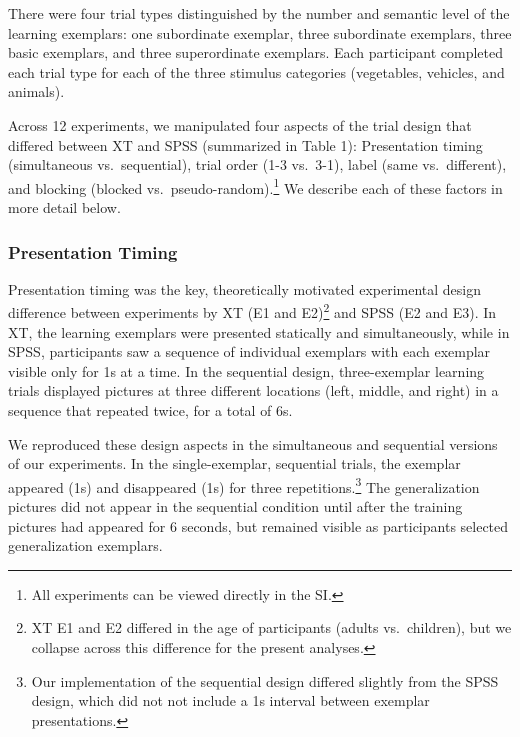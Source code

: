 \documentclass[english,floatsintext,man]{apa6}
\theoremstyle{definition}
\theoremstyle{definition}
\theoremstyle{definition}
\theoremstyle{remark}
\begin{document}
There were four trial types distinguished by the number and semantic
level of the learning exemplars: one subordinate exemplar, three
subordinate exemplars, three basic exemplars, and three superordinate
exemplars. Each participant completed each trial type for each of the
three stimulus categories (vegetables, vehicles, and animals).

Across 12 experiments, we manipulated four aspects of the trial design
that differed between XT and SPSS (summarized in Table 1): Presentation
timing (simultaneous vs.~sequential), trial order (1-3 vs.~3-1), label
(same vs.~different), and blocking (blocked
vs.~pseudo-random).\footnote{All experiments can be viewed directly in the SI.}
We describe each of these factors in more detail below.

\subsubsection{Presentation Timing}\label{presentation-timing}

Presentation timing was the key, theoretically motivated experimental
design difference between experiments by XT (E1 and
E2)\footnote{XT E1 and E2 differed in the age of participants (adults vs.\ children), but we collapse across this difference for the present analyses.}
and SPSS (E2 and E3). In XT, the learning exemplars were presented
statically and simultaneously, while in SPSS, participants saw a
sequence of individual exemplars with each exemplar visible only for 1s
at a time. In the sequential design, three-exemplar learning trials
displayed pictures at three different locations (left, middle, and
right) in a sequence that repeated twice, for a total of 6s.

We reproduced these design aspects in the simultaneous and sequential
versions of our experiments. In the single-exemplar, sequential trials,
the exemplar appeared (1s) and disappeared (1s) for three
repetitions.\footnote{Our implementation of the sequential design differed slightly from the SPSS design, which did not not include a 1s interval between exemplar presentations.}
The generalization pictures did not appear in the sequential condition
until after the training pictures had appeared for 6 seconds, but
remained visible as participants selected generalization exemplars.
\end{document}

